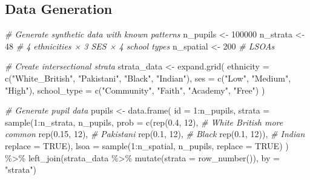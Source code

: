 \documentclass[
]{article}
\newenvironment{Shaded}{\begin{snugshade}}{\end{snugshade}}
\newcommand{\AttributeTok}[1]{\textcolor[rgb]{0.77,0.63,0.00}{#1}}
\newcommand{\CommentTok}[1]{\textcolor[rgb]{0.56,0.35,0.01}{\textit{#1}}}
\newcommand{\ConstantTok}[1]{\textcolor[rgb]{0.00,0.00,0.00}{#1}}
\newcommand{\DecValTok}[1]{\textcolor[rgb]{0.00,0.00,0.81}{#1}}
\newcommand{\FloatTok}[1]{\textcolor[rgb]{0.00,0.00,0.81}{#1}}
\newcommand{\FunctionTok}[1]{\textcolor[rgb]{0.00,0.00,0.00}{#1}}
\newcommand{\NormalTok}[1]{#1}
\newcommand{\OtherTok}[1]{\textcolor[rgb]{0.56,0.35,0.01}{#1}}
\newcommand{\SpecialCharTok}[1]{\textcolor[rgb]{0.00,0.00,0.00}{#1}}
\newcommand{\StringTok}[1]{\textcolor[rgb]{0.31,0.60,0.02}{#1}}
\begin{document}
\hypertarget{data-generation}{%
\subsection{Data Generation}\label{data-generation}}

\begin{Shaded}
\begin{Highlighting}[]
\CommentTok{\# Generate synthetic data with known patterns}
\NormalTok{n\_pupils }\OtherTok{\textless{}{-}} \DecValTok{100000}
\NormalTok{n\_strata }\OtherTok{\textless{}{-}} \DecValTok{48}  \CommentTok{\# 4 ethnicities × 3 SES × 4 school types}
\NormalTok{n\_spatial }\OtherTok{\textless{}{-}} \DecValTok{200}  \CommentTok{\# LSOAs}

\CommentTok{\# Create intersectional strata}
\NormalTok{strata\_data }\OtherTok{\textless{}{-}} \FunctionTok{expand.grid}\NormalTok{(}
  \AttributeTok{ethnicity =} \FunctionTok{c}\NormalTok{(}\StringTok{"White\_British"}\NormalTok{, }\StringTok{"Pakistani"}\NormalTok{, }\StringTok{"Black"}\NormalTok{, }\StringTok{"Indian"}\NormalTok{),}
  \AttributeTok{ses =} \FunctionTok{c}\NormalTok{(}\StringTok{"Low"}\NormalTok{, }\StringTok{"Medium"}\NormalTok{, }\StringTok{"High"}\NormalTok{),}
  \AttributeTok{school\_type =} \FunctionTok{c}\NormalTok{(}\StringTok{"Community"}\NormalTok{, }\StringTok{"Faith"}\NormalTok{, }\StringTok{"Academy"}\NormalTok{, }\StringTok{"Free"}\NormalTok{)}
\NormalTok{)}

\CommentTok{\# Generate pupil data}
\NormalTok{pupils }\OtherTok{\textless{}{-}} \FunctionTok{data.frame}\NormalTok{(}
  \AttributeTok{id =} \DecValTok{1}\SpecialCharTok{:}\NormalTok{n\_pupils,}
  \AttributeTok{strata =} \FunctionTok{sample}\NormalTok{(}\DecValTok{1}\SpecialCharTok{:}\NormalTok{n\_strata, n\_pupils, }
    \AttributeTok{prob =} \FunctionTok{c}\NormalTok{(}\FunctionTok{rep}\NormalTok{(}\FloatTok{0.4}\NormalTok{, }\DecValTok{12}\NormalTok{),  }\CommentTok{\# White British more common}
             \FunctionTok{rep}\NormalTok{(}\FloatTok{0.15}\NormalTok{, }\DecValTok{12}\NormalTok{), }\CommentTok{\# Pakistani }
             \FunctionTok{rep}\NormalTok{(}\FloatTok{0.1}\NormalTok{, }\DecValTok{12}\NormalTok{),  }\CommentTok{\# Black}
             \FunctionTok{rep}\NormalTok{(}\FloatTok{0.1}\NormalTok{, }\DecValTok{12}\NormalTok{)), }\CommentTok{\# Indian}
    \AttributeTok{replace =} \ConstantTok{TRUE}\NormalTok{),}
  \AttributeTok{lsoa =} \FunctionTok{sample}\NormalTok{(}\DecValTok{1}\SpecialCharTok{:}\NormalTok{n\_spatial, n\_pupils, }\AttributeTok{replace =} \ConstantTok{TRUE}\NormalTok{)}
\NormalTok{) }\SpecialCharTok{\%\textgreater{}\%}
  \FunctionTok{left\_join}\NormalTok{(strata\_data }\SpecialCharTok{\%\textgreater{}\%} \FunctionTok{mutate}\NormalTok{(}\AttributeTok{strata =} \FunctionTok{row\_number}\NormalTok{()), }\AttributeTok{by =} \StringTok{"strata"}\NormalTok{)}


\end{Highlighting}
\end{Shaded}
\end{document}
